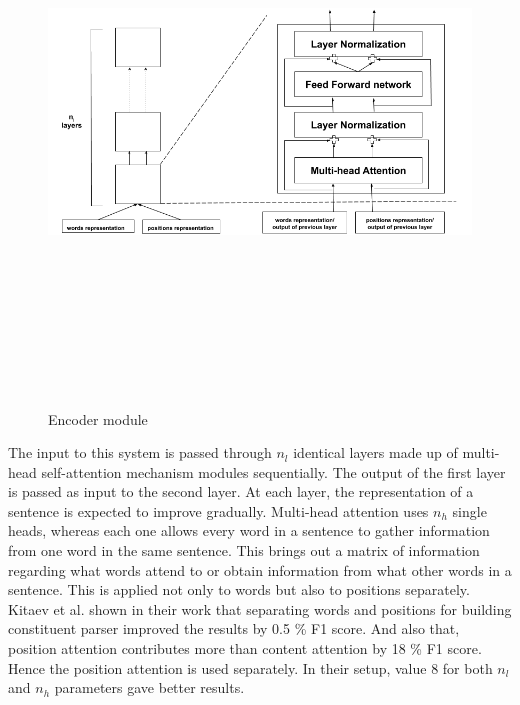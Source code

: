 \documentclass[a4paper, 11pt]{article}
\begin{document}
\begin{figure}[htpb]
    \centering
    \includegraphics[width=\textwidth,height=15cm,keepaspectratio=true]
    {encoder.png}
    \caption{
        Encoder module
    }
    \label{fig:encoder_module}
\end{figure}

The input to this system is passed through $n_l$ identical layers made up of multi-head self-attention mechanism modules sequentially. The output of the first layer is passed as input to the second layer. At each layer, the representation of a sentence is expected to improve gradually. Multi-head attention uses $n_h$ single heads, whereas each one allows every word in a sentence to gather information from one word in the same sentence. This brings out a matrix of information regarding what words attend to or obtain information from what other words in a sentence. This is applied not only to words but also to positions separately. Kitaev et al. \parencite*{Kitaev2019} shown in their work that separating words and positions for building constituent parser improved the results by 0.5 \% F1 score. And also that, position attention contributes more than content attention by 18 \% F1 score. Hence the position attention is used separately. In their setup, value 8 for both $n_l$ and $n_h$ parameters gave better results. 
\end{document}

